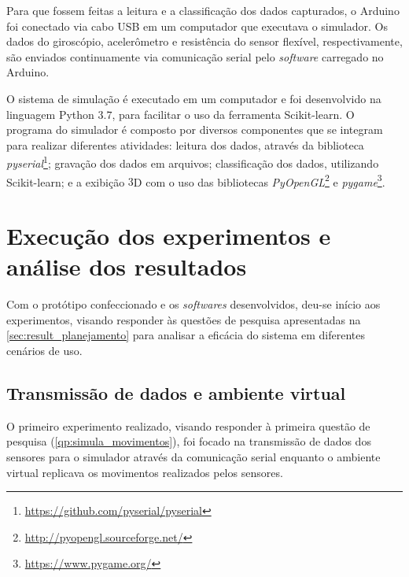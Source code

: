 Para que fossem feitas a leitura e a classificação dos dados capturados, o Arduino foi conectado via cabo USB em um computador que executava o simulador. Os dados do giroscópio, acelerômetro e resistência do sensor flexível, respectivamente, são enviados continuamente via comunicação serial pelo \textit{software} carregado no Arduino.



O sistema de simulação é executado em um computador e foi desenvolvido na linguagem Python $3.7$, para facilitar o uso da ferramenta Scikit-learn\cite{pedregosa:2011}. O programa do simulador é composto por diversos componentes que se integram para realizar diferentes atividades: leitura dos dados, através da biblioteca \textit{pyserial}\footnote{\url{https://github.com/pyserial/pyserial}}; gravação dos dados em arquivos; classificação dos dados, utilizando Scikit-learn; e a exibição $3$D com o uso das bibliotecas \textit{PyOpenGL}\footnote{\url{http://pyopengl.sourceforge.net/}} e \textit{pygame}\footnote{\url{https://www.pygame.org/}}.

%
\section{Execução dos experimentos e análise dos resultados}\label{sec:result_execucao}
%
Com o protótipo confeccionado e os \textit{softwares} desenvolvidos, deu-se início aos experimentos, visando responder às questões de pesquisa apresentadas na \autoref{sec:result_planejamento} para analisar a eficácia do sistema \productname{} em diferentes cenários de uso.

\subsection{Transmissão de dados e ambiente virtual}

O primeiro experimento realizado, visando responder à primeira questão de pesquisa (\ref{qp:simula_movimentos}), foi focado na transmissão de dados dos sensores para o simulador através da comunicação serial enquanto o ambiente virtual replicava os movimentos realizados pelos sensores.

